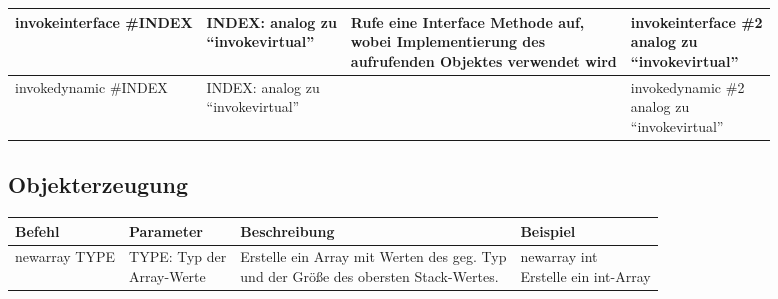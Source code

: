 \begin{table}[H]
\begin{tabular}{l|l|l|l|}
		invokeinterface \#INDEX 
		& \multlineTable{INDEX:  analog zu\\ \enquote{invokevirtual}} 
		& \multlineTable{Rufe eine \textbf{Interface} Methode auf,\\ wobei Implementierung des\\ aufrufenden Objektes verwendet wird} 
		& \multlineTable{invokeinterface \#2 \\ analog zu\\ \enquote{invokevirtual}} \\ \hline
		
		invokedynamic \#INDEX 
		& \multlineTable{INDEX:  analog zu\\ \enquote{invokevirtual}} 
		& \open 
		& \multlineTable{invokedynamic \#2 \\ analog zu\\ \enquote{invokevirtual}} \\ \hline		
	\end{tabular}
\end{table}

\subsection{Objekterzeugung}
\begin{table}[H]
	\centering
	\label{my-label}
	\begin{tabular}{l|l|l|l}
		Befehl & Parameter & Beschreibung & Beispiel \\ \hline
		
		newarray TYPE& \multlineTable{TYPE: Typ der\\ Array-Werte} & \multlineTable{Erstelle ein Array mit Werten des geg. Typ\\ und der Größe des obersten Stack-Wertes.} & \multlineTable{newarray int\\ Erstelle ein int-Array} \\ \hline	
		
	\end{tabular}
\end{table}

